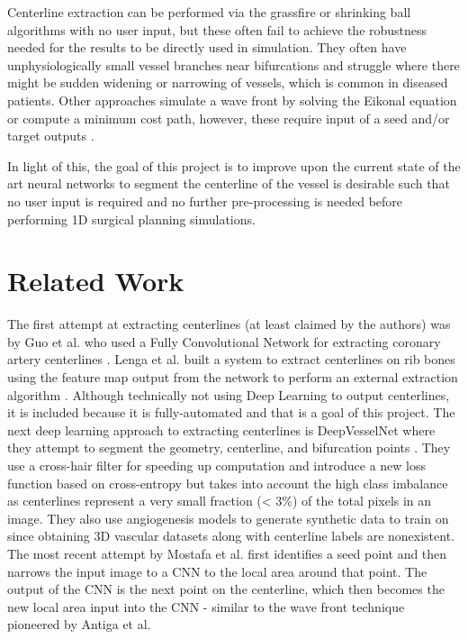\documentclass[10pt,twocolumn,letterpaper]{article}
\begin{document}
Centerline extraction can be performed via the grassfire or shrinking ball algorithms with no user input, but these often fail to achieve the robustness needed for the results to be directly used in simulation. They often have unphysiologically small vessel branches near bifurcations and struggle where there might be sudden widening or narrowing of vessels, which is common in diseased patients. Other approaches simulate a wave front by solving the Eikonal equation or compute a minimum cost path, however, these require input of a seed and/or target outputs \cite{antigaCenterlineComputationGeometric2003} \cite{jinRobustEfficientCurve2016}.

In light of this, the goal of this project is to improve upon the current state of the art neural networks to segment the centerline of the vessel is desirable such that no user input is required and no further pre-processing is needed before performing 1D surgical planning simulations.


\section{Related Work}

The first attempt at extracting centerlines (at least claimed by the authors) was by Guo et al. who used a Fully Convolutional Network for extracting coronary artery centerlines \cite{guoDeepCenterlineMultitaskFully2019}. Lenga et al. built a system to extract centerlines on rib bones using the feature map output from the network to perform an external extraction algorithm \cite{lengaDeepLearningBased2019}. Although technically not using Deep Learning to output centerlines, it is included because it is fully-automated and that is a goal of this project. The next deep learning approach to extracting centerlines is DeepVesselNet where they attempt to segment the geometry, centerline, and bifurcation points \cite{tettehDeepVesselNetVesselSegmentation2020}. They use a cross-hair filter for speeding up computation and introduce a new loss function based on cross-entropy but takes into account the high class imbalance as centerlines represent a very small fraction (< 3\%) of the total pixels in an image. They also use angiogenesis models to generate synthetic data to train on since obtaining 3D vascular datasets along with centerline labels are nonexistent. The most recent attempt by Mostafa et al. first identifies a seed point and then narrows the input image to a CNN to the local area around that point. The output of the CNN is the next point on the centerline, which then becomes the new local area input into the CNN \cite{mostafaImprovedCenterlineExtraction2021} - similar to the wave front technique pioneered by Antiga et al.
\end{document}
